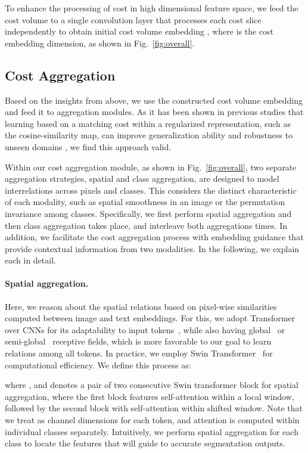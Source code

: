 \documentclass[10pt,twocolumn,letterpaper]{article}
\begin{document}
To enhance the processing of cost in high dimensional feature space, we feed the cost volume to a single convolution layer that processes each cost slice  independently to obtain initial cost volume embedding , where  is the cost embedding dimension, as shown in Fig.~\ref{fig:overall}. 

\subsection{Cost Aggregation}
Based on the insights from above, we use the constructed cost volume embedding and feed it to aggregation modules. 
As it has been shown in previous studies that learning based on a matching cost within a regularized representation, such as the cosine-similarity map, can improve generalization ability and robustness to unseen domains \cite{cai2020matching,song2021adastereo,liu2022graftnet}, we find this approach valid. 

Within our cost aggregation module, as shown in Fig.~\ref{fig:overall}, two separate aggregation strategies, \ie spatial and class aggregation, are designed to model interrelations across pixels and classes. This considers the distinct characteristic of each modality, such as spatial smoothness in an image or the permutation invariance among classes. Specifically, we first perform spatial aggregation and then class aggregation takes place, and interleave both aggregations  times. In addition, we facilitate the cost aggregation process with embedding guidance that provide contextual information from two modalities. In the following, we explain each in detail.
\vspace{-10pt}
\paragraph{Spatial aggregation.} Here, we reason about the spatial relations based on pixel-wise similarities computed between image and text embeddings. 
For this, we adopt Transformer~\cite{vaswani2017attention,liu2021swin} over CNNs for its adaptability to input tokens~\cite{dai2021coatnet}, while also having global~\cite{vaswani2017attention} or semi-global~\cite{liu2021swin,hong2022cost} receptive fields, which is more favorable to our goal to learn relations among all tokens.  In practice, we employ Swin Transformer~\cite{liu2021swin} for computational efficiency. We define this process as:

where , and  denotes a pair of two consecutive Swin transformer block for spatial aggregation, where the first block features self-attention within a local window, followed by the second block with self-attention within shifted window. Note that we treat  as channel dimensions for each token, and attention is computed within individual classes separately. Intuitively, we perform spatial aggregation for each class to locate the features that will guide to accurate segmentation outputs. 
\end{document}
